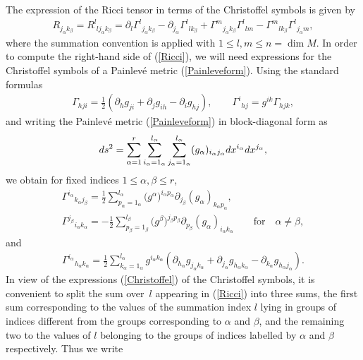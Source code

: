 \documentclass[11pt]{article}
\numberwithin{equation}{section}
\newcommand{\ialpha}{i_{\alpha}}
\newcommand{\jbeta}{j_{\beta}}
\newcommand{\jalpha}{j_{\alpha}}
\newcommand{\kbeta}{k_{\beta}}
\newcommand{\lbeta}{l_{\beta}}
\newcommand{\lalpha}{l_{\alpha}}
\newcommand{\palpha}{p_{\alpha}}
\newcommand{\kalpha}{k_{\alpha}}
\newcommand{\pbeta}{p_{\beta}}
\newcommand{\halpha}{h_{\alpha}}
\begin{document}
The expression of the Ricci tensor in terms of the Christoffel symbols is given by
\begin{gather}\label{Ricci}
R_{\jalpha \kbeta}=R^{l}_{{\phantom l} l \jalpha \kbeta}=\partial_{l}{\Gamma^{l}}_{\jalpha \kbeta}-\partial_{\jalpha}{\Gamma^{l}}_{l\kbeta}+{\Gamma^{m}}_{\jalpha \kbeta}{\Gamma^{l}}_{l m}-{\Gamma^{m}}_{l\kbeta}{\Gamma^{l}}_{\jalpha m},
\end{gather}
where the summation convention is applied with $1\leq l,m \leq n = \dim M$. In order to compute the right-hand side of (\ref{Ricci}), we will need expressions for the Christoffel symbols of a Painlev\'e metric (\ref{Painleveform}). Using the standard formulas
\begin{gather*}%
\Gamma_{hji}=\frac{1}{2}(\partial_{h}g_{ji}+\partial_{j}g_{ih}-\partial_{i}g_{hj}), \qquad {\Gamma^{i}}_{hj}=g^{ik}\Gamma_{hjk},
\end{gather*}
and writing the Painlev\'e metric (\ref{Painleveform}) in block-diagonal form as
\[
{\rm d}s^{2}=\sum_{\alpha = 1}^{r}\sum_{\ialpha=1_{\alpha}}^{\lalpha}\sum_{\jalpha=1_{\alpha}}^{\lalpha}(g_{\alpha})_{\ialpha \jalpha}{\rm d}x^{\ialpha}{\rm d}x^{\jalpha},
\]
we obtain for fixed indices $1\leq \alpha,\beta \leq r$,
\begin{gather}
{\Gamma^{\ialpha}}_{\kalpha \jbeta}=\frac{1}{2}\sum_{\palpha=1_{\alpha}}^{\lalpha} \big(g^{\alpha}\big)^{\ialpha \palpha}\partial_{\jbeta}(g_{\alpha})_{\kalpha \palpha},\nonumber\\
 {\Gamma^{\jbeta}}_{\ialpha \kalpha}=-\frac{1}{2}\sum_{\pbeta=1_{\beta}}^{\lbeta}\big(g^{\beta}\big)^{\jbeta \pbeta}\partial_{\pbeta}(g_{\alpha})_{\ialpha \kalpha}\qquad \text{for} \quad \alpha \neq \beta,\label{Christoffel}
\end{gather}
and
\begin{gather}\label{Christoffelmixed}
{\Gamma^{\ialpha}}_{\halpha \kalpha}=\frac{1}{2}\sum_{\kalpha=1_{\alpha}}^{\lalpha} g^{\ialpha \kalpha}(\partial_{\halpha}g_{\jalpha \kalpha}+\partial_{\jalpha}g_{\halpha \kalpha}-\partial_{\kalpha}g_{\halpha \jalpha}).
\end{gather}
In view of the expressions (\ref{Christoffel}) of the Christoffel symbols, it is convenient to split the sum over~$l$ appearing in (\ref{Ricci}) into three sums, the first sum corresponding to the values of the summation index $l$ lying in groups of indices different from the groups corresponding to $\alpha$ and $\beta$, and the remaining two to the values of $l$ belonging to the groups of indices labelled by $\alpha$ and $\beta$ respectively. Thus we write
\end{document}
